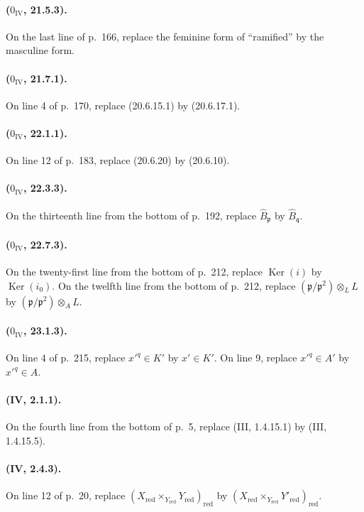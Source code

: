 \paragraph{($0_{\mathrm{IV}}$, 21.5.3).}
On the last line of p.~166, replace the feminine form of ``ramified'' by
the masculine form.

\paragraph{($0_{\mathrm{IV}}$, 21.7.1).}
On line 4 of p.~170, replace (20.6.15.1) by (20.6.17.1).

\paragraph{($0_{\mathrm{IV}}$, 22.1.1).}
On line 12 of p.~183, replace (20.6.20) by (20.6.10).

\paragraph{($0_{\mathrm{IV}}$, 22.3.3).}
On the thirteenth line from the bottom of p.~192, replace
$\widehat B_{\mathfrak p}$ by $\widehat B_{\mathfrak q}$.

\paragraph{($0_{\mathrm{IV}}$, 22.7.3).}
On the twenty-first line from the bottom of p.~212, replace
$\operatorname{Ker}(i)$ by $\operatorname{Ker}(i_0)$.  On the twelfth
line from the bottom of p.~212, replace
$(\mathfrak p/\mathfrak p^2)\otimes_L L$ by
$(\mathfrak p/\mathfrak p^2)\otimes_A L$.

\paragraph{($0_{\mathrm{IV}}$, 23.1.3).}
On line 4 of p.~215, replace $x'^q\in K'$ by $x'\in K'$.  On line 9,
replace $x'^q\in A'$ by $x'^q\in A$.

\paragraph{(IV, 2.1.1).}
On the fourth line from the bottom of p.~5, replace (III, 1.4.15.1) by
(III, 1.4.15.5).

\paragraph{(IV, 2.4.3).}
On line 12 of p.~20, replace
$(X_{\mathrm{red}}\times_{Y_{\mathrm{red}}}Y_{\mathrm{red}})_{\mathrm{red}}$
by
$(X_{\mathrm{red}}\times_{Y_{\mathrm{red}}}Y'_{\mathrm{red}})_{\mathrm{red}}$.

